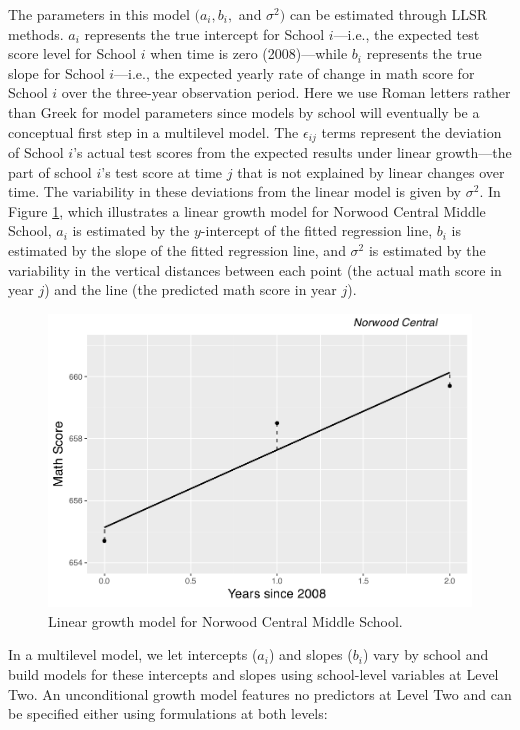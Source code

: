 \documentclass[
]{krantz}
\begin{document}
The parameters in this model \((a_{i}, b_{i},\) and \(\sigma^2)\) can be estimated through LLSR methods. \(a_{i}\) represents the true intercept for School \(i\)---i.e., the expected test score level for School \(i\) when time is zero (2008)---while \(b_{i}\) represents the true slope for School \(i\)---i.e., the expected yearly rate of change in math score for School \(i\) over the three-year observation period. Here we use Roman letters rather than Greek for model parameters since models by school will eventually be a conceptual first step in a multilevel model. The \(\epsilon_{ij}\) terms represent the deviation of School \(i\)'s actual test scores from the expected results under linear growth---the part of school \(i\)'s test score at time \(j\) that is not explained by linear changes over time. The variability in these deviations from the linear model is given by \(\sigma^2\). In Figure \ref{fig:lon-scat3}, which illustrates a linear growth model for Norwood Central Middle School, \(a_{i}\) is estimated by the \(y\)-intercept of the fitted regression line, \(b_{i}\) is estimated by the slope of the fitted regression line, and \(\sigma^2\) is estimated by the variability in the vertical distances between each point (the actual math score in year \(j\)) and the line (the predicted math score in year \(j\)).

\begin{figure}

{\centering \includegraphics[width=0.6\linewidth]{bookdown-BeyondMLR_files/figure-latex/lon-scat3-1} 

}

\caption{Linear growth model for Norwood Central Middle School.}\label{fig:lon-scat3}
\end{figure}

In a multilevel model, we let intercepts (\(a_{i}\)) and slopes (\(b_{i}\)) vary by school and build models for these intercepts and slopes using school-level variables at Level Two. An unconditional growth model features no predictors at Level Two and can be specified either using formulations at both levels:
\end{document}
